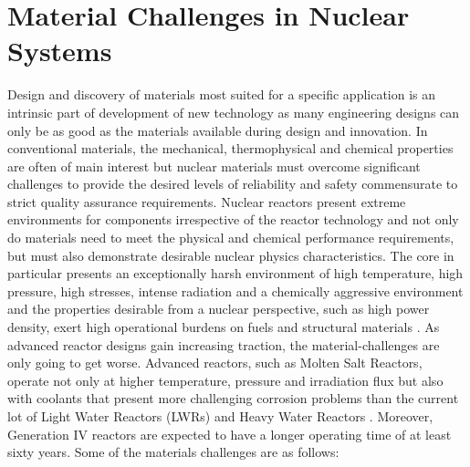 \section{Material Challenges in Nuclear Systems}
	Design and discovery of materials most suited for a specific application is an intrinsic part of development of new technology as many engineering designs can only be as good as the materials available during design and innovation. In conventional materials, the mechanical, thermophysical and chemical properties are often of main interest but nuclear materials must overcome significant challenges to provide the desired levels of reliability and safety commensurate to strict quality assurance requirements. Nuclear reactors present extreme environments for components irrespective of the reactor technology and not only do materials need to meet the physical and chemical performance requirements, but must also demonstrate desirable nuclear physics characteristics. The core in particular presents an exceptionally harsh environment of high temperature, high pressure, high stresses, intense radiation and a chemically aggressive environment and the properties desirable from a nuclear perspective, such as high power density, exert high operational burdens on fuels and structural materials \cite{Zinkle:2013aa}.  As advanced reactor designs gain increasing traction, the material-challenges are only going to get worse. Advanced reactors, such as Molten Salt Reactors, operate not only at higher temperature, pressure and irradiation flux but also with coolants that present more challenging corrosion problems than the current lot of Light Water Reactors (LWRs) and Heavy Water Reactors \cite{Allen:2010aa}. Moreover, Generation {IV}  reactors are expected to have a longer operating time of at least sixty years. Some of the materials challenges are as follows:
